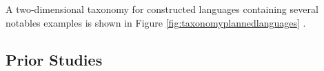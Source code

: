 \documentclass[12pt,a4paper]{article}
\numberwithin{figure}{section}
\numberwithin{table}{section}
\numberwithin{definition}{section}
\begin{document}
A two-dimensional taxonomy for constructed languages containing several notables examples is shown in Figure \ref{fig:taxonomyplannedlanguages} \parencite{Gobbo2016article}.

\subsection{Prior Studies}
\label{ssec:priorstudies}


\end{document}
